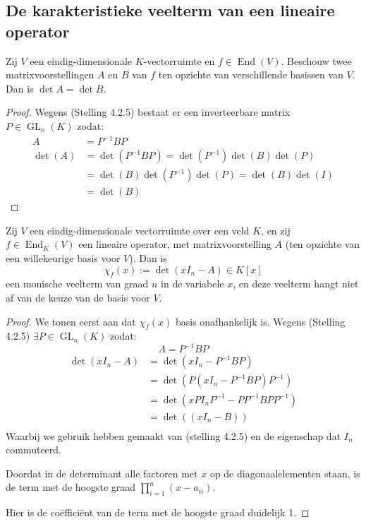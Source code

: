 \subsection{De karakteristieke veelterm van een lineaire operator}

\begin{lemma}[6.1.1]
    Zij $V$ een eindig-dimensionale $K$-vectorruimte en $f \in \operatorname{End}(V)$. Beschouw twee matrixvoorstellingen $A$ en $B$ van $f$ ten opzichte van verschillende basissen van $V$. Dan is $\det A = \det B$.
\end{lemma}
\begin{proof}
    Wegens (Stelling 4.2.5) bestaat er een inverteerbare matrix $P \in \operatorname{GL}_n(K)$ zodat:
    \begin{align*}
        A &= P^{-1}BP\\
        \det(A) &= \det(P^{-1}BP) = \det(P^{-1})\det(B)\det(P)\\
        &= \det(B)\det(P^{-1})\det(P) = \det(B)\det(I)\\
        &= \det(B)
    \end{align*}
\end{proof}

\begin{lemma}[6.1.4]
    Zij $V$ een eindig-dimensionale vectorruimte over een veld $K$, en zij $f \in \operatorname{End}_K(V)$ een lineaire operator, met matrixvoorstelling $A$ (ten opzichte van een willekeurige basis voor $V$). Dan is
    \[ \chi_f(x) := \det(xI_n - A) \in K[x] \]
    een monische veelterm van graad $n$ in de variabele $x$, en deze veelterm hangt niet af van de keuze van de basis voor $V$.
\end{lemma}
\begin{proof}
    We tonen eerst aan dat \(\chi_f(x)\) basis onafhankelijk is.
    Wegens (Stelling 4.2.5)  $\exists P \in \operatorname{GL}_n(K)$ zodat:
    \[A = P^{-1}BP\]
    \begin{align*}
        \det(xI_n - A) 
        &= \det(xI_n - P^{-1}BP)\\
         &= \det(P(xI_n - P^{-1}BP)P^{-1})\\
         &= \det(xPI_nP^{-1} - PP^{-1}BPP^{-1})\\
         &= \det((xI_n - B)) \\
    \end{align*}
    Waarbij we gebruik hebben gemaakt van (stelling 4.2.5) en de eigenschap dat \(I_n\) commuteerd.

    Doordat in de determinant alle factoren met \(x\) op de diagonaalelementen staan,
    is de term met de hoogste graad \(\prod_{i = 1}^n (x - a_{ii})\).

    Hier is de coëfficiënt van de term met de hoogste graad duidelijk 1.
\end{proof}

